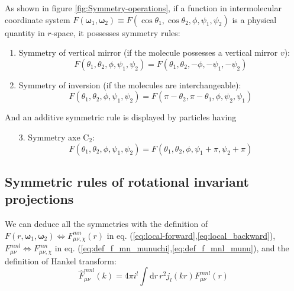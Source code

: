 As shown in figure \ref{fig:Symmetry-operations}, if a function in
intermolecular coordinate system $F(\boldsymbol{\omega}_{1},\boldsymbol{\omega}_{2})\equiv F(\cos\theta_{1},\cos\theta_{2},\phi,\psi_{1},\psi_{2})$
is a physical quantity in $r$-space, it possesses symmetry rules:
\begin{enumerate}
\item Symmetry of vertical mirror (if the molecule possesses a vertical
mirror $v$): 
\begin{equation}
F(\theta_{1},\theta_{2},\phi,\psi_{1},\psi_{2})=F(\theta_{1},\theta_{2},-\phi,-\psi_{1},-\psi_{2})\label{eq:symm_dcf_1}
\end{equation}
\item Symmetry of inversion (if the molecules are interchangeable): 
\begin{equation}
F(\theta_{1},\theta_{2},\phi,\psi_{1},\psi_{2})=F(\pi-\theta_{2},\pi-\theta_{1},\phi,\psi_{2},\psi_{1})\label{eq:symm_dcf_2}
\end{equation}
\end{enumerate}
And an additive symmetric rule is displayed by particles having 
\begin{enumerate}
\item [3.]Symmetry axe $\mathrm{C}_{2}$: 
\begin{equation}
F(\theta_{1},\theta_{2},\phi,\psi_{1},\psi_{2})=F(\theta_{1},\theta_{2},\phi,\psi_{1}+\pi,\psi_{2}+\pi)
\end{equation}
\end{enumerate}

\subsection{Symmetric rules of rotational invariant projections}

We can deduce all the symmetries with the definition of $F(r,\boldsymbol{\omega}_{1},\boldsymbol{\omega}_{2})\Leftrightarrow F_{\mu\nu,\chi}^{mn}(r)$
in eq. (\ref{eq:local-forward},\ref{eq:local_backward}), $F_{\mu\nu}^{mnl}\Leftrightarrow F_{\mu\nu,\chi}^{mn}$
in eq. (\ref{eq:def_f_mn_munuchi},\ref{eq:def_f_mnl_munu}), and
the definition of Hankel transform:
\begin{equation}
\hat{F}_{\mu\nu}^{mnl}(k)=4\pi i^{l}\int\mathrm{d}r\,r^{2}j_{l}(kr)F_{\mu\nu}^{mnl}(r)\label{eq:hankel}
\end{equation}

